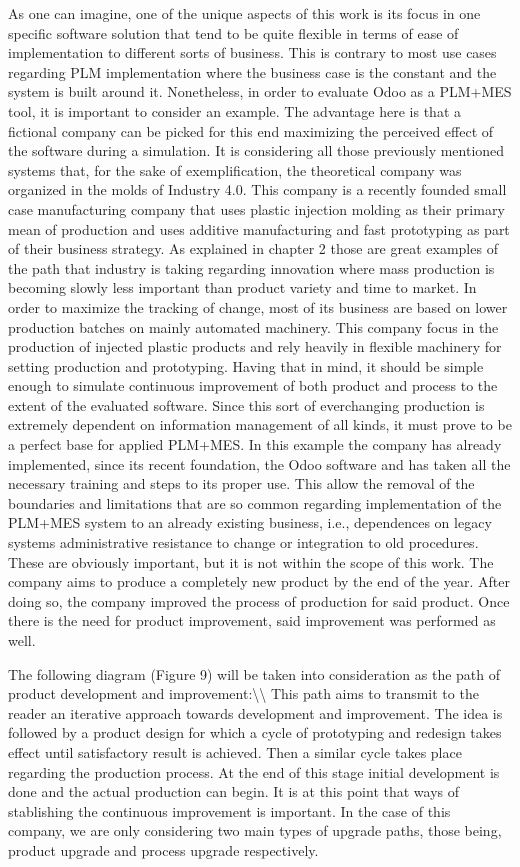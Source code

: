As one can imagine, one of the unique aspects of this work is its focus
in one specific software solution that tend to be quite flexible in
terms of ease of implementation to different sorts of business. This is
contrary to most use cases regarding PLM implementation where the
business case is the constant and the system is built around it.
Nonetheless, in order to evaluate Odoo as a PLM+MES tool, it is
important to consider an example. The advantage here is that a fictional
company can be picked for this end maximizing the perceived effect of
the software during a simulation. It is considering all those previously
mentioned systems that, for the sake of exemplification, the theoretical
company was organized in the molds of Industry 4.0. This company is a
recently founded small case manufacturing company that uses plastic
injection molding as their primary mean of production and uses additive
manufacturing and fast prototyping as part of their business strategy.
As explained in chapter 2 those are great examples of the path that
industry is taking regarding innovation where mass production is
becoming slowly less important than product variety and time to market.
In order to maximize the tracking of change, most of its business are
based on lower production batches on mainly automated machinery. This
company focus in the production of injected plastic products and rely
heavily in flexible machinery for setting production and prototyping.
Having that in mind, it should be simple enough to simulate continuous
improvement of both product and process to the extent of the evaluated
software. Since this sort of everchanging production is extremely
dependent on information management of all kinds, it must prove to be a
perfect base for applied PLM+MES. In this example the company has
already implemented, since its recent foundation, the Odoo software and
has taken all the necessary training and steps to its proper use. This
allow the removal of the boundaries and limitations that are so common
regarding implementation of the PLM+MES system to an already existing
business, i.e., dependences on legacy systems administrative resistance
to change or integration to old procedures. These are obviously
important, but it is not within the scope of this work. The company aims
to produce a completely new product by the end of the year. After doing
so, the company improved the process of production for said product.
Once there is the need for product improvement, said improvement was
performed as well.

The following diagram (Figure 9) will be taken into consideration as the
path of product development and
improvement:\textbackslash\textbackslash{} This path aims to transmit to
the reader an iterative approach towards development and improvement.
The idea is followed by a product design for which a cycle of
prototyping and redesign takes effect until satisfactory result is
achieved. Then a similar cycle takes place regarding the production
process. At the end of this stage initial development is done and the
actual production can begin. It is at this point that ways of
stablishing the continuous improvement is important. In the case of this
company, we are only considering two main types of upgrade paths, those
being, product upgrade and process upgrade respectively.

